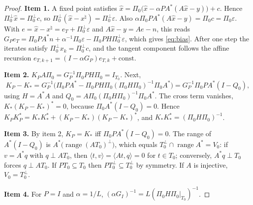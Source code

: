 \documentclass[11pt]{article}
\theoremstyle{definition}
\theoremstyle{remark}
\newcommand{\inner}[2]{\langle #1,#2\rangle}
\newcommand{\range}{\operatorname{range}}
\newcommand{\xt}{x^\natural}
\begin{document}
\begin{proof}
\textbf{Item 1.} A fixed point satisfies $\hat x=\Pi_0\big(\hat x-\alpha PA^*(A\hat x-y)\big)+c$. Hence
$\Pi_0^\perp\hat x=\Pi_0^\perp c$, so $\Pi_0^\perp(\hat x-\xt)=\Pi_0^\perp\varepsilon$. Also
$\alpha\Pi_0PA^*(A\hat x-y)=\Pi_0c=\Pi_0\varepsilon$. With $e=\hat x-\xt=e_T+\Pi_0^\perp\varepsilon$ and $A\hat x-y=Ae-n$,
this reads $G_Pe_T=\Pi_0PA^*n+\alpha^{-1}\Pi_0\varepsilon-\Pi_0PH\Pi_0^\perp\varepsilon$, which gives
\eqref{eq:bias}. After one step the iterates satisfy $\Pi_0^\perp x_k=\Pi_0^\perp c$, and the tangent component
follows the affine recursion $e_{T,k+1}=(I-\alpha G_P)e_{T,k}+\mathrm{const}$.

\textbf{Item 2.} $K_PA\Pi_0=G_P^{-1}\Pi_0PH\Pi_0=I_{T_0}$. Next,
\[
K_P-K_*=G_P^{-1}\big(\Pi_0PA^*-\Pi_0PH\Pi_0(\Pi_0H\Pi_0)^{-1}\Pi_0A^*\big)=G_P^{-1}\Pi_0PA^*(I-Q_0),
\]
using $H=A^*A$ and $Q_0=A\Pi_0(\Pi_0H\Pi_0)^{-1}\Pi_0A^*$. The cross term vanishes,
$K_*(K_P-K_*)^*=0$, because $\Pi_0A^*(I-Q_0)=0$. Hence
$K_PK_P^*=K_*K_*^*+(K_P-K_*)(K_P-K_*)^*$, and $K_*K_*^*=(\Pi_0H\Pi_0)^{-1}$.

\textbf{Item 3.} By item 2, $K_P=K_*$ iff $\Pi_0PA^*(I-Q_0)=0$. The range of $A^*(I-Q_0)$ is
$A^*\big(\range(AT_0)^\perp\big)$, which equals $T_0^\perp\cap\range A^*=V_0$: if $v=A^*q$ with $q\perp AT_0$, then
$\inner{t}{v}=\inner{At}{q}=0$ for $t\in T_0$; conversely, $A^*q\perp T_0$ forces $q\perp AT_0$. If $PT_0\subseteq T_0$
then $PT_0^\perp\subseteq T_0^\perp$ by symmetry. If $A$ is injective, $V_0=T_0^\perp$.

\textbf{Item 4.} For $P=I$ and $\alpha=1/L$, $(\alpha G_I)^{-1}=L(\Pi_0H\Pi_0|_{T_0})^{-1}$.
\end{proof}
\end{document}
